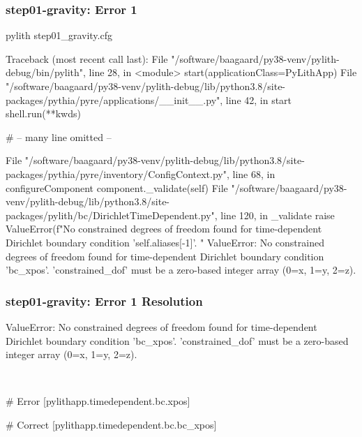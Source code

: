 \documentclass[aspectratio=169]{beamer}
\begin{document}
\begin{frame}[fragile]
  \frametitle{{\ttfamily step01-gravity}: Error 1}

\begin{bashcode}
pylith step01_gravity.cfg

Traceback (most recent call last):
  File "/software/baagaard/py38-venv/pylith-debug/bin/pylith", line 28, in <module>
    start(applicationClass=PyLithApp)
  File "/software/baagaard/py38-venv/pylith-debug/lib/python3.8/site-packages/pythia/pyre/applications/__init__.py", line 42, in start
    shell.run(**kwds)

  # -- many line omitted --

  File "/software/baagaard/py38-venv/pylith-debug/lib/python3.8/site-packages/pythia/pyre/inventory/ConfigContext.py", line 68, in configureComponent
    component._validate(self)
  File "/software/baagaard/py38-venv/pylith-debug/lib/python3.8/site-packages/pylith/bc/DirichletTimeDependent.py", line 120, in _validate
    raise ValueError(f"No constrained degrees of freedom found for time-dependent Dirichlet boundary condition '{self.aliases[-1]}'. "
ValueError: No constrained degrees of freedom found for time-dependent Dirichlet boundary condition 'bc_xpos'.
'constrained_dof' must be a zero-based integer array (0=x, 1=y, 2=z).
\end{bashcode}

\end{frame}


\begin{frame}[t,fragile]
  \frametitle{{\ttfamily step01-gravity}: Error 1 Resolution}

  \tserror
  \begin{bashcode}
    ValueError: No constrained degrees of freedom found for time-dependent Dirichlet boundary condition 'bc_xpos'.
    'constrained_dof' must be a zero-based integer array (0=x, 1=y, 2=z).
  \end{bashcode}

  \pause\\[1pt]

  \begin{cfgcode}
    # Error
    [pylithapp.timedependent.bc.xpos]

    # Correct
    [pylithapp.timedependent.bc.bc_xpos]
  \end{cfgcode}

\end{frame}
\end{document}
